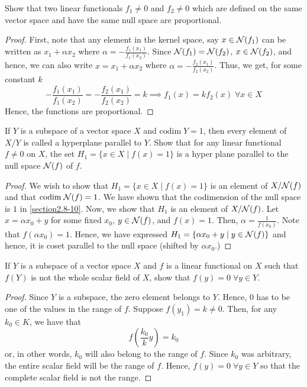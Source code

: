 \begin{question}
    Show that two linear functionals $f_1 \neq 0$ and $f_2 \neq 0$ which are defined on the same vector space and have the same null space are proportional.
    \label{section2.8-11}
\end{question}
\begin{proof}
    First, note that any element in the kernel space, say $x \in \mathcal{N}(f_1)$ can be written as $x_1 + \alpha x_2$ where $\alpha = -\frac{f_1(x_1)}{f_1(x_2)}$. Since $\mathcal{N}(f_1) = \mathcal{N}(f_2)$, $x \in \mathcal{N}(f_2)$, and hence, we can also write $x = x_1 + \alpha x_2$ where $\alpha = -\frac{f_2(x_1)}{f_2(x_2)}$. Thus, we get, for some constant $k$
    \[-\frac{f_1(x_1)}{f_1(x_2)} = -\frac{f_2(x_1)}{f_2(x_2)} = k \implies f_1(x) = k f_2(x) \;\forall x \in X\]
    Hence, the functions are proportional.
\end{proof}

\begin{question}
    If $Y$ is a subspace of a vector space $X$ and $\textrm{codim}\;Y= 1$, then every element of $X/Y$ is called a hyperplane parallel to $Y$. Show that for any linear functional $f \neq 0$ on $X$, the set $H_1 = \{x \in X \mid f(x) = 1\}$ is a hyper plane parallel to the null space $\mathcal{N}(f)$ of $f$.
    \label{section2.8-12}
\end{question}
\begin{proof}
    We wish to show that $H_1 = \{x \in X \mid f(x) = 1\}$ is an element of $X/\mathcal{N}(f)$ and that $\textrm{codim}\; \mathcal{N}(f) = 1$. We have shown that the codimension of the null space is $1$ in \ref{section2.8-10}. Now, we show that $H_1$ is an element of $X/\mathcal{N}(f)$. Let $x = \alpha x_0 + y$ for some fixed $x_0$, $y \in \mathcal{N}(f)$, and $f(x) = 1$. Then, $\alpha = \frac{1}{f(x_0)}$. Note that $f(\alpha x_0) = 1$. Hence, we have expressed $H_1 = \{\alpha x_0 + y \mid y \in \mathcal{N}(f)\}$ and hence, it is coset parallel to the null space (shifted by $\alpha x_0$.)
\end{proof}

\begin{question}
    If $Y$ is a subspace of  a vector space $X$ and $f$ is a linear functional on $X$ such that $f(Y)$ is not the whole scalar field of $X$, show that $f(y) = 0 \; \forall y \in Y$.
    \label{section2.8-13}
\end{question}
\begin{proof}
    Since $Y$ is a subspace, the zero element belongs to $Y$. Hence, $0$ has to be one of the values in the range of $f$. Suppose $f(y_1) = k \neq 0$. Then, for any $k_0 \in K$, we have that 
    \[f\left(\frac{k_0}{k} y\right) = k_0 \]
    or, in other words, $k_0$ will also belong to the range of $f$. Since $k_0$ was arbitrary, the entire scalar field will be the range of $f$. Hence, $f(y) = 0\;\forall y \in Y$ so that the complete scalar field is not the range.
\end{proof}

